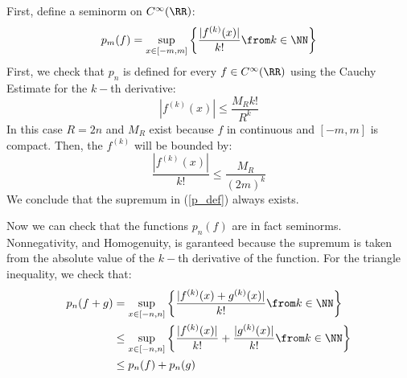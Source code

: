 First,  define a seminorm on $C^\infty(\RR)$:
$$p_m(f)= \sup_{x\in [-m,m]} \left\{ \frac{|f^{(k)}(x) |}{k!} \from k\in \NN \right\}\label{p_def}$$
First, we check that $p_n$ is defined for every $f\in C^\infty(\RR)$ using the Cauchy Estimate for the $k-$th derivative:
$$ |f^{(k)}(x) | \leq \frac{M_R k!}{R^k}$$
In this case $R=2n$ and $M_R$ exist because $f$ in continuous and $[-m,m]$ is compact. 
Then, the  $f^{(k)} $ will be bounded by:
$$\frac{|f^{(k)}(x) |}{k!} \leq \frac{M_R}{(2m)^k}$$
We conclude that the supremum in (\ref{p_def}) always exists.

Now we can check that the functions $p_n(f)$ are in fact seminorms. 
Nonnegativity, and Homogenuity, is garanteed because the supremum is taken from the absolute value of the $k-$th derivative of the function.
For the triangle inequality, we check that:
\begin{align*}
p_n(f+g) & = \sup_{x\in [-n,n]} \left\{ \frac{|f^{(k)}(x) + g^{(k)}(x)  |}{k!} \from k\in \NN \right\}\\
&\leq \sup_{x\in [-n,n]} \left\{ \frac{|f^{(k)}(x) |}{k!} +\frac{|g^{(k)}(x) |}{k!}  \from k\in \NN \right\}\\
&\leq p_n(f) + p_n(g)
\end{align*}



